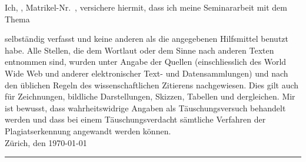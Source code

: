 Ich, \autor, Matrikel-Nr.\ \matrikelnr, versichere hiermit, dass ich meine Seminararbeit mit dem Thema
\begin{quote}
\textit{\titel} \textit{\untertitel}
\end{quote}
selbständig verfasst und keine anderen als die angegebenen Hilfsmittel benutzt habe. Alle Stellen, die dem Wortlaut oder dem Sinne nach anderen Texten entnommen sind, wurden unter Angabe der Quellen (einschliesslich des World Wide Web und anderer elektronischer Text- und Datensammlungen) und nach den üblichen Regeln des wissenschaftlichen Zitierens nachgewiesen. Dies gilt auch für Zeichnungen, bildliche Darstellungen, Skizzen, Tabellen und dergleichen. Mir ist bewusst, dass wahrheitswidrige Angaben als Täuschungsversuch behandelt werden und dass bei einem Täuschungsverdacht sämtliche Verfahren der Plagiatserkennung angewandt werden können.\\[6ex]


Zürich, den \today


\rule[-0.2cm]{5cm}{0.5pt}

\textsc{\autor} 

